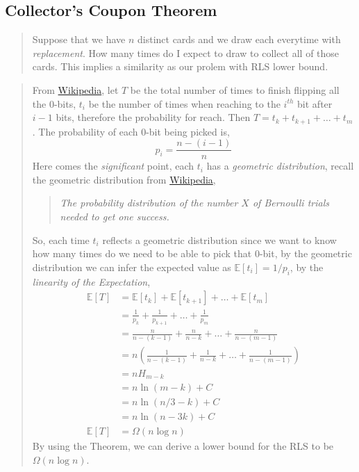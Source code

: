 \documentclass[a4paper, 12pt]{article}
\begin{document}
        \subsection{Collector's Coupon Theorem}
            \begin{quote}
                Suppose that we have $n$ distinct cards and we draw each everytime with \emph{replacement}. How many times do I expect to draw to collect all 
                of those cards. This implies a similarity as our prolem with RLS lower bound. 
            \end{quote}
            \begin{quote}
                From \href{https://en.wikipedia.org/wiki/Coupon_collector%27s_problem}{Wikipedia}, let $T$ be the total number of times to finish flipping 
                all the 0-bits, $t_i$ be the number of times when reaching to the $i^{th}$ bit after $i - 1$ bits, therefore the probability for reach. Then 
                $T = t_{k} + t_{k+1} + \ldots + t_m$. The probability of each 0-bit being picked is,
                \begin{equation*}
                    p_i = \frac{n - (i - 1)}{n}
                \end{equation*}
                Here comes the \emph{significant} point, each $t_i$ has a \emph{geometric distribution}, recall the geometric distribution from
                \href{https://en.wikipedia.org/wiki/Geometric_distribution}{Wikipedia},
                \begin{quote}
                    \itshape The probability distribution of the number $X$ of Bernoulli trials needed to get one success. 
                \end{quote}
                So, each time $t_i$ reflects a geometric distribution since we want to know how many times do we need to be able to pick that 0-bit,
                by the geometric distribution we can infer the expected value as $\mathbb{E}[t_i] = 1/p_i$, by the \emph{linearity of the Expectation},
                \begin{align*}
                    \mathbb{E}[T] &= \mathbb{E}[t_k] + \mathbb{E}[t_{k+1}] + \ldots + \mathbb{E}[t_{m}]\\
                    &= \frac{1}{p_k} + \frac{1}{p_{k+1}} +\ldots + \frac{1}{p_m}\\
                    &= \frac{n}{n-(k-1)} + \frac{n}{n-k}+\ldots+\frac{n}{n-(m-1)}\\
                    &= n\left(\frac{1}{n-(k-1)} + \frac{1}{n-k}+\ldots+\frac{1}{n-(m-1)}\right)\\
                    &= nH_{m-k}\\
                    &= n\ln(m-k) + C\\
                    &= n\ln(n/3-k) + C\\
                    &= n\ln(n - 3k) + C\\
                    \mathbb{E}[T]&=\Omega(n\log n)
                \end{align*}
                By using the Theorem, we can derive a lower bound for the RLS to be $\Omega(n\log n)$.
            \end{quote}
\end{document}

